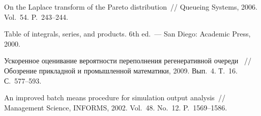 \begin{multicols}{2}
{{\begin{thebibliography}{99}
 On the Laplace transform
of the Pareto distribution~// Queueing Systems, 2006.  Vol.~54. P.~243--244.

Table of integrals,
series, and products. 6th ed.~--- San Diego: Academic Press, 2000.

    Ускоренное
оценивание вероятности переполнения  регенеративной очереди~ // 
Обозрение прикладной и промышленной математики, 2009.  Вып.~4. Т.~16. С.~577--593.

\label{end\stat}


  An improved
batch means procedure for simulation output analysis~// Management
Science, INFORMS, 2002. Vol.~48. No.~12. P.~1569--1586.
 \end{thebibliography}
}
}


\end{multicols}